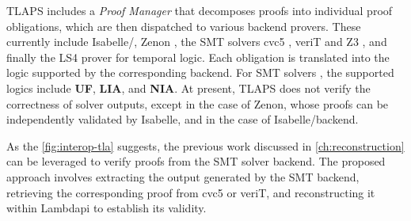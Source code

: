 TLAPS includes a \emph{Proof Manager} that decomposes proofs into individual proof obligations, which are then dispatched to various backend provers.
These currently include Isabelle/\tlaplus \cite{isabelle-hol-ref}, Zenon \cite{zenonmodulo},
the SMT solvers cvc5 \cite{cvc5}, veriT \cite{verit} and Z3 \cite{z3}, and finally the LS4 prover for temporal logic.
Each obligation is translated into the logic supported by the corresponding backend.
For SMT solvers \cite{new-encoding-tlaps}, the supported logics include \textbf{UF}, \textbf{LIA}, and \textbf{NIA}.
At present, TLAPS does not verify the correctness of solver outputs, except in the case of Zenon, whose proofs can be independently validated by Isabelle,
and in the case of Isabelle/\tlaplus backend.

As the \cref{fig:interop-tla} suggests, the previous work discussed in \cref{ch:reconstruction} can be leveraged to verify \tlaplus proofs from the SMT solver backend.
The proposed approach involves extracting the output generated by the SMT backend, retrieving the corresponding proof from cvc5 or veriT, and reconstructing it within Lambdapi to establish its validity.





